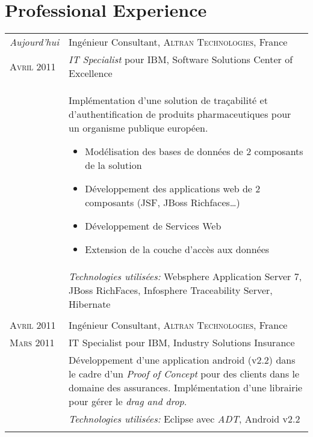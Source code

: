 %
%
%

\section{\texorpdfstring{\color{Blue}Professional Experience}{Professional Experience}}
\begin{longtable}{R{2.5cm}|p{14.8cm}}
 	\emph{Aujourd'hui} & Ingénieur Consultant, \textsc{Altran Technologies}, France\\
 	\textsc{Avril 2011}& \emph{IT Specialist} pour IBM, Software Solutions Center of Excellence\\&
 	\footnotesize{
 		Implémentation d'une solution de traçabilité et d'authentification
 	 	de produits pharmaceutiques pour un organisme publique européen.
 		\begin{itemize}
			\item Modélisation des bases de données de 2 composants de la solution
			\item Développement des applications web de 2 composants (JSF, JBoss Richfaces\ldots)
			\item Développement de Services Web
			\item Extension de la couche d'accès aux données
		\end{itemize}
		\vspace{-1em}
	}\\&
 	\footnotesize{\emph{Technologies utilisées:} Websphere Application Server 7, JBoss RichFaces, Infosphere Traceability Server, Hibernate }\\
  \\
 	\textsc{Avril 2011} & Ingénieur Consultant, \textsc{Altran Technologies}, France\\
 	\textsc{Mars 2011}& IT Specialist pour IBM, Industry Solutions Insurance\\&
 	\footnotesize{Développement d'une application android (v2.2) dans le cadre d'un \emph{Proof of Concept} 
 	pour des clients dans le domaine des assurances. Implémentation d'une librairie pour gérer le \emph{drag and drop}.}\\&
 	\footnotesize{\emph{Technologies utilisées:} Eclipse avec \emph{ADT}, Android v2.2 }\\
 \\

\end{longtable}
